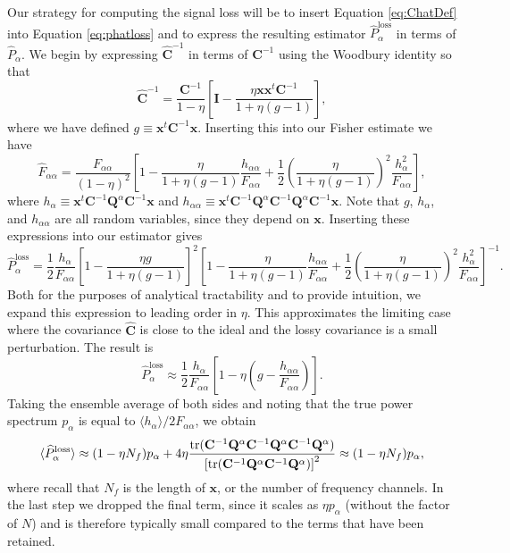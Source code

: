 \documentclass[preprint2,numberedappendix,tighten]{aastex6}  %
\newcommand{\x}{\mathbf{x}}
\newcommand{\C}{\mathbf{C}}
\newcommand{\Chat}{\mathbf{\widehat{C}}}
\newcommand{\Q}{\mathbf{Q}}
\newcommand{\I}{\mathbf{I}}
\begin{document}
Our strategy for computing the signal loss will be to insert Equation \eqref{eq:ChatDef} into Equation \eqref{eq:phatloss} and to express the resulting estimator $\widehat{P}_\alpha^\textrm{loss}$ in terms of $\widehat{P}_\alpha$. We begin by expressing $\Chat^{-1}$ in terms of $\C^{-1}$ using the Woodbury identity so that
\begin{equation}
\Chat^{-1} = \frac{\C^{-1}}{1-\eta} \left[ \I - \frac{\eta \x \x^t \C^{-1}}{1+ \eta (g-1)}\right],
\end{equation}
where we have defined $g \equiv \x^t \C^{-1} \x$. Inserting this into our Fisher estimate we have
\begin{equation}
\widehat{F}_{\alpha \alpha} = \frac{F_{\alpha \alpha}}{(1-\eta)^2} \left[ 1 -\frac{\eta }{1+ \eta (g-1)} \frac{h_{\alpha \alpha}}{F_{\alpha \alpha}} + \frac{1}{2} \left( \frac{\eta }{1+ \eta (g-1)} \right)^2 \frac{h_\alpha^2}{F_{\alpha \alpha}}\right],
\end{equation}
where $h_\alpha \equiv \x^t \C^{-1} \Q^\alpha \C^{-1} \x $ and $h_{\alpha \alpha} \equiv \x^t \C^{-1} \Q^\alpha \C^{-1} \Q^\alpha \C^{-1}\x $. Note that $g$, $h_\alpha$, and $h_{\alpha \alpha}$ are all random variables, since they depend on $\x$. Inserting these expressions into our estimator gives
\begin{equation}
\label{eq:phatlossexpanded}
\widehat{P}_\alpha^\textrm{loss} = \frac{1}{2} \frac{h_\alpha}{F_{\alpha \alpha}} \left[ 1 - \frac{\eta g}{1+ \eta (g-1)}\right]^2  \left[ 1 -\frac{\eta }{1+ \eta (g-1)} \frac{h_{\alpha \alpha}}{F_{\alpha \alpha}} + \frac{1}{2} \left( \frac{\eta }{1+ \eta (g-1)} \right)^2 \frac{h_\alpha^2}{F_{\alpha \alpha}}\right]^{-1}.
\end{equation}
Both for the purposes of analytical tractability and to provide intuition, we expand this expression to leading 
order in $\eta$. This approximates the limiting case where the covariance $\Chat$ is close to the ideal and the 
lossy covariance is a small perturbation.  The result is
\begin{equation}
\widehat{P}_\alpha^\textrm{loss} \approx \frac{1}{2} \frac{h_\alpha}{F_{\alpha \alpha}} \left[ 1 - \eta \left( g - \frac{h_{\alpha \alpha}}{F_{\alpha \alpha}}\right)\right].
\end{equation}
Taking the ensemble average of both sides and noting that the true power spectrum $p_\alpha$ is equal to $\langle h_\alpha \rangle / 2 F_{\alpha \alpha}$, we obtain
\begin{equation}
\langle \widehat{P}_\alpha^\textrm{loss} \rangle \approx (1- \eta N_f) p_\alpha + 4 \eta \frac{\rm{tr} (\C^{-1} \Q^\alpha \C^{-1} \Q^\alpha \C^{-1} \Q^\alpha )}{\left[ \rm{tr} (\C^{-1} \Q^\alpha \C^{-1} \Q^\alpha  ) \right]^2} \approx (1- \eta N_f) p_\alpha,
\end{equation}
where recall that $N_f$ is the length of $\x$, or the number of frequency channels. In the last step we dropped the final term, since it scales as $\eta p_\alpha$ (without the factor of $N$) and is therefore typically small compared to the terms that have been retained.
\end{document}
